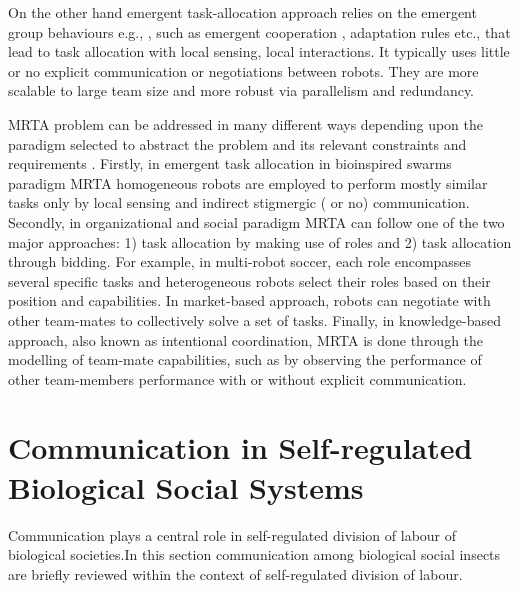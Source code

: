 On the other hand emergent task-allocation approach relies on the emergent group behaviours e.g., \cite{Kube+1993}, such as emergent cooperation \cite{Lerman+2006}, adaptation rules \cite{Liu+2007} etc., that lead to task allocation with local sensing, local interactions. It typically uses little or no explicit communication or negotiations between robots. They are more scalable to large team size and more robust via parallelism and redundancy.

MRTA problem can be addressed in many different ways depending upon the paradigm selected to abstract the problem and its relevant constraints and requirements \cite{Parker2008}. Firstly, in emergent task allocation in bioinspired swarms paradigm MRTA homogeneous robots are employed to perform mostly similar tasks only by local sensing and indirect stigmergic ( or no) communication. Secondly, in organizational and social paradigm MRTA can follow one of the two major approaches: 1) task allocation by making use of roles and 2) task allocation through bidding. For example, in multi-robot soccer, each role encompasses several specific tasks and heterogeneous robots select their roles based on their position and capabilities. In market-based approach, robots can negotiate with other team-mates to collectively solve a set of tasks. Finally, in knowledge-based approach, also known as intentional coordination, MRTA is done through the modelling of team-mate capabilities, such as by observing the performance of other team-members performance with or without explicit communication.
\section{Communication in Self-regulated Biological Social Systems}
\label{bg:comm-biology}
Communication plays a central role in self-regulated division of labour of biological societies.In this section communication among biological social insects are briefly reviewed within the context of self-regulated  division of labour.

